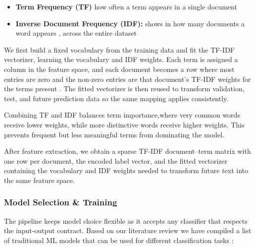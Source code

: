 \begin{itemize}
  \item \textbf{Term Frequency (TF) } how often a term appears in a single document
  \item \textbf{Inverse Document Frequency (IDF): } shows in how many documents a word appears , across the entire dataset

\end{itemize}

\smallskip
We first build a fixed vocabulary from the training data and fit the TF-IDF vectorizer, learning the vocabulary and IDF weights. Each term is assigned a column in the feature space, and each document becomes a row where most entries are zero and the non-zero entries are that document’s TF-IDF weights for the terms present \cite{das:2023}. The fitted vectorizer is then reused to transform validation, test, and future prediction data so the same mapping applies consistently.

\smallskip

Combining TF and IDF balances term importance,where very common words receive lower weights, while more distinctive words receive higher weights. This prevents frequent but less meaningful terms from dominating the model.

\smallskip

After feature extraction, we obtain a sparse TF-IDF document–term matrix with one row per document, the encoded label vector, and the fitted vectorizer containing the vocabulary and IDF weights needed to transform future text into the same feature space.

\subsubsection{Model Selection \& Training}
The pipeline keeps model choice flexible as it accepts any classifier that respects the input-output contract. Based on our literature review we have compiled a list of traditional ML models that can be used for different classification tasks  \cite{allam:2024} :

